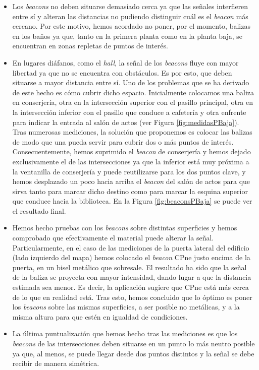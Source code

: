 \begin{itemize}
	\item Los \textit{beacons} no deben situarse demasiado cerca ya que las señales interfieren entre sí y alteran las distancias no pudiendo distinguir cuál es el \textit{beacon} más cercano. Por este motivo, hemos acordado no poner, por el momento, balizas en los baños ya que, tanto en la primera planta como en la planta baja, se encuentran en zonas repletas de puntos de interés.
	
	\item En lugares diáfanos, como el \textit{hall}, la señal de los \textit{beacons} fluye con mayor libertad ya que no se encuentra con obstáculos. Es por esto, que deben situarse a mayor distancia entre sí. Uno de los problemas que se ha derivado de este hecho es cómo cubrir dicho espacio. Inicialmente colocamos una baliza en conserjería, otra en la intersección superior con el pasillo principal, otra en la intersección inferior con el pasillo que conduce a cafetería y otra enfrente para indicar la entrada al salón de actos (ver Figura \ref{fig:medidasPBaja}). Tras numerosas mediciones, la solución que proponemos es colocar las balizas de modo que una pueda servir para cubrir dos o más puntos de interés. Consecuentemente, hemos suprimido el \textit{beacon} de conserjería y hemos dejado exclusivamente el de las intersecciones ya que la inferior está muy próxima a la ventanilla de conserjería y puede reutilizarse para los dos puntos clave, y hemos desplazado un poco hacia arriba el \textit{beacon} del salón de actos para que sirva tanto para marcar dicho destino como para marcar la esquina superior que conduce hacia la biblioteca. En la Figura \ref{fig:beaconsPBaja} se puede ver el resultado final.
	
	\item Hemos hecho pruebas con los \textit{beacons} sobre distintas superficies y hemos comprobado que efectivamente el material puede alterar la señal. Particularmente, en el caso de las mediciones de la puerta lateral del edificio (lado izquierdo del mapa) hemos colocado el \textit{beacon} CPne justo encima de la puerta, en un bisel metálico que sobresale. El resultado ha sido que la señal de la baliza se proyecta con mayor intensidad, dando lugar a que la distancia estimada sea menor. Es decir, la aplicación sugiere que CPne está más cerca de lo que en realidad está. Tras esto, hemos concluido que lo óptimo es poner los \textit{beacons} sobre las mismas superficies, a ser posible no metálicas, y a la misma altura para que estén en igualdad de condiciones. 
	
	\item La última puntualización que hemos hecho tras las mediciones es que los \textit{beacons} de las intersecciones deben situarse en un punto lo más neutro posible ya que, al menos, se puede llegar desde dos puntos distintos y la señal se debe recibir de manera simétrica. 
\end{itemize}

